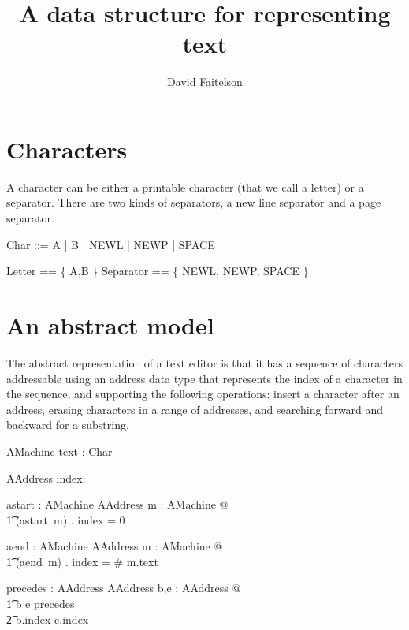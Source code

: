 \documentclass{article}
\title{A data structure for representing text}
\author{David Faitelson}
\begin{document}
\maketitle

\section{Characters} 

A character can be either a printable character (that we call
a letter) or a separator. 
There are two kinds of separators, a new line separator and a
page separator.

\begin{zed}
  Char ::= A | B | NEWL | NEWP | SPACE 
\end{zed}

\begin{zed}
  Letter == \{ A,B \} \also
  Separator == \{ NEWL, NEWP, SPACE \}
\end{zed}

\section{An abstract model}

The abstract representation of a text editor is that it has a
sequence of characters addressable using an address data type that
represents the index of a character in the sequence, and supporting
the following operations: insert a character after an address,
erasing characters in a range of addresses, and searching forward
and backward for a substring.

\begin{schema}{AMachine}
  text : \seq Char
\end{schema}

\begin{schema}{AAddress}
  index: \nat
\end{schema}

\begin{axdef}
  astart : AMachine \fun AAddress
\where
  \forall m : AMachine @ \\
\t1 (astart~m) . index = 0
\end{axdef} 

\begin{axdef}
  aend : AMachine \fun AAddress
\where
  \forall m : AMachine @ \\
\t1 (aend~m) . index = \# m.text
\end{axdef} 

\begin{axdef}
  precedes : AAddress \rel AAddress 
\where
  \forall b,e : AAddress @ \\
\t1 b \mapsto e \in precedes \iff \\
\t2   b.index \leq e.index
\end{axdef}
\end{document}
